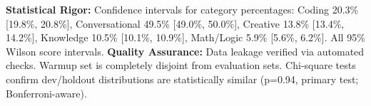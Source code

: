 \begin{table}[t]
\textbf{Statistical Rigor:} Confidence intervals for category percentages: Coding 20.3\% [19.8\%, 20.8\%], Conversational 49.5\% [49.0\%, 50.0\%], Creative 13.8\% [13.4\%, 14.2\%], Knowledge 10.5\% [10.1\%, 10.9\%], Math/Logic 5.9\% [5.6\%, 6.2\%]. All 95\% Wilson score intervals.
\textbf{Quality Assurance:} Data leakage verified via automated checks. Warmup set is completely disjoint from evaluation sets. Chi-square tests confirm dev/holdout distributions are statistically similar (p=0.94, primary test; Bonferroni-aware).
\end{table}
